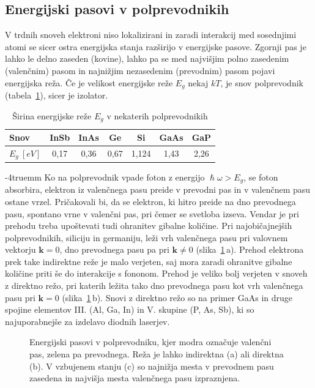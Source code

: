 \subsection*{Energijski pasovi v polprevodnikih}
V trdnih snoveh elektroni niso lokalizirani in zaradi interakcij med sosednjimi atomi
se sicer ostra energijska stanja razširijo v energijske pasove. Zgornji pas je lahko 
le delno zaseden (kovine), lahko pa se med najvišjim polno zasedenim 
(valenčnim) pasom in najnižjim nezasedenim (prevodnim) pasom pojavi energijska reža. 
Če je velikost energijske reže $E_g$ nekaj $kT$, je snov polprevodnik 
(tabela~\ref{table:gap}), sicer je izolator.
\begin{table}[ht]
 \centering
\begin{tabular}{|l|c|c|c|c|c|c|} \hline  
      Snov & InSb & InAs & Ge & Si & GaAs & GaP \\ \hline
      $E_g~[\si{eV}]$ & 0,17 & 0,36 & 0,67 & 1,124 & 1,43 & 2,26  \\ \hline  
\end{tabular}
  \caption{Širina energijske reže $E_g$ v nekaterih polprevodnikih}
\label{table:gap}
\end{table}
\vglue-4truemm
Ko na polprevodnik vpade foton z energijo $\hslash\omega > E_g$, se foton absorbira, elektron
iz valenčnega pasu preide v prevodni pas in v valenčnem pasu ostane vrzel. Pričakovali bi, 
da se elektron, ki hitro preide na dno prevodnega pasu, spontano vrne v valenčni 
pas, pri čemer se svetloba izseva. Vendar je pri 
prehodu treba upoštevati tudi ohranitev gibalne količine. Pri najobičajnejših polprevodnikih, 
siliciju in germaniju, leži vrh valenčnega pasu pri valovnem vektorju $\mathbf{k}=0$, 
dno prevodnega pasu pa pri $\mathbf{k} \neq 0$ (slika~\ref{fig:Ek}\,a).
Prehod elektrona prek take indirektne reže je malo verjeten, saj mora zaradi ohranitve 
gibalne količine priti še do interakcije s fononom. Prehod je veliko bolj verjeten v 
snoveh z direktno režo, pri katerih ležita tako dno prevodnega pasu kot 
vrh valenčnega pasu 
pri $\mathbf{k}=0$ (slika~\ref{fig:Ek}\,b). Snovi z direktno režo so na primer GaAs in 
druge spojine elementov III. (Al, Ga, In) in V. skupine (P, As, Sb), ki so najuporabnejše za izdelavo diodnih laserjev.
\begin{figure}[ht]
\centering
\def\svgwidth{128truemm} 

\caption{Energijski pasovi v polprevodniku, kjer modra označuje valenčni pas, 
zelena pa prevodnega. Reža je lahko indirektna (a) ali direktna (b). V vzbujenem stanju (c) so 
najnižja mesta v prevodnem pasu zasedena in najvišja mesta valenčnega pasu
izpraznjena. 
}
\label{fig:Ek}
\end{figure}

